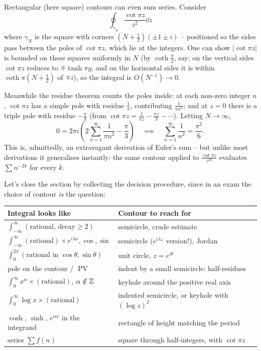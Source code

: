 \documentclass[a4paper]{scrartcl}
\newcommand{\pv}{\operatorname{PV}}
\begin{document}
\begin{example}
	Rectangular (here square) contours can even sum series. Consider
	$$
	\oint_{\gamma_N} \frac{\cot \pi z}{z^2} \dd z
	$$
	where $\gamma_N$ is the square with corners $\left(N + \frac 12\right)(\pm 1 \pm i)$ -- positioned so the sides pass between the poles of $\cot \pi z$, which lie at the integers. One can show $|\cot \pi z|$ is bounded on these squares uniformly in $N$ (by $\coth \frac{\pi}{2}$, say: on the vertical sides $\cot \pi z$ reduces to $\mp\tanh \pi y$, and on the horizontal sides it is within $\coth\pi(N + \frac 12)$ of $\mp i$), so the integral is $O(N^{-1}) \to 0$.

	Meanwhile the residue theorem counts the poles inside: at each non-zero integer $n$, $\cot \pi z$ has a simple pole with residue $\frac{1}{\pi}$, contributing $\frac{1}{\pi n^2}$; and at $z = 0$ there is a triple pole with residue $-\frac{\pi}{3}$ (from $\cot \pi z = \frac{1}{\pi z} - \frac{\pi z}{3} - \cdots$). Letting $N \to \infty$,
	$$
	0 = 2\pi i \left( 2\sum_{n = 1}^\infty \frac{1}{\pi n^2} - \frac \pi 3\right)
	\quad\implies\quad
	\sum_{n=1}^\infty \frac{1}{n^2} = \frac{\pi^2}{6}.
	$$
	This is, admittedly, an extravagant derivation of Euler's sum -- but unlike most derivations it generalises instantly: the same contour applied to $\frac{\cot \pi z}{z^{2k}}$ evaluates $\sum n^{-2k}$ for every $k$.
\end{example}

Let's close the section by collecting the decision procedure, since in an exam the choice of contour \emph{is} the question:

\begin{center}
\begin{tabular}{l|l}
	\textbf{Integral looks like} & \textbf{Contour to reach for} \\
	\hline
	$\int_{-\infty}^\infty (\text{rational, decay} \geq 2)$ & semicircle, crude estimate \\
	$\int_{-\infty}^\infty (\text{rational}) \times e^{i\lambda x}, \cos, \sin$ & semicircle ($e^{i\lambda z}$ version!), Jordan \\
	$\int_0^{2\pi} (\text{rational in } \cos\theta, \sin\theta)$ & unit circle, $z = e^{i\theta}$ \\
	pole on the contour / $\pv$ & indent by a small semicircle: half-residues \\
	$\int_0^\infty x^\alpha \times (\text{rational})$, $\alpha \notin \mathbb{Z}$ & keyhole around the positive real axis \\
	$\int_0^\infty \log x \times (\text{rational})$ & indented semicircle, or keyhole with $(\log z)^2$ \\
	$\cosh$, $\sinh$, $e^{\alpha x}$ in the integrand & rectangle of height matching the period \\
	series $\sum f(n)$ & square through half-integers, with $\cot \pi z$ \\
\end{tabular}
\end{center}
\end{document}
